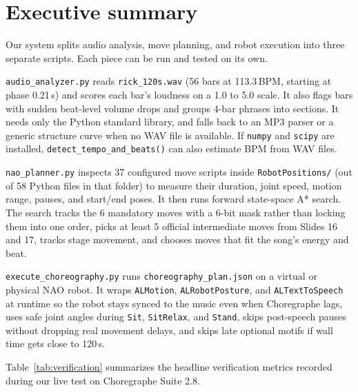 \documentclass[11pt,a4paper]{article}
\newcommand{\code}[1]{\texttt{#1}}
\begin{document}
\section{Executive summary}

Our system splits audio analysis, move planning, and robot execution into three separate scripts. Each piece can be run and tested on its own.

\code{audio\_analyzer.py} reads \code{rick\_120s.wav} (56 bars at 113.3\,BPM, starting at phase 0.21\,s) and scores each bar's loudness on a 1.0 to 5.0 scale. It also flags bars with sudden beat-level volume drops and groups 4-bar phrases into sections. It needs only the Python standard library, and falls back to an MP3 parser or a generic structure curve when no WAV file is available. If \code{numpy} and \code{scipy} are installed, \code{detect\_tempo\_and\_beats()} can also estimate BPM from WAV files.

\code{nao\_planner.py} inspects 37 configured move scripts inside \code{RobotPositions/} (out of 58 Python files in that folder) to measure their duration, joint speed, motion range, pauses, and start/end poses. It then runs forward state-space A* search. The search tracks the 6 mandatory moves with a 6-bit mask rather than locking them into one order, picks at least 5 official intermediate moves from Slides 16 and 17, tracks stage movement, and chooses moves that fit the song's energy and beat.

\code{execute\_choreography.py} runs \code{choreography\_plan.json} on a virtual or physical NAO robot. It wraps \code{ALMotion}, \code{ALRobotPosture}, and \code{ALTextToSpeech} at runtime so the robot stays synced to the music even when Choregraphe lags, uses safe joint angles during \code{Sit}, \code{SitRelax}, and \code{Stand}, skips post-speech pauses without dropping real movement delays, and skips late optional motifs if wall time gets close to 120\,s.

Table~\ref{tab:verification} summarizes the headline verification metrics recorded during our live test on Choregraphe Suite 2.8.
\end{document}
